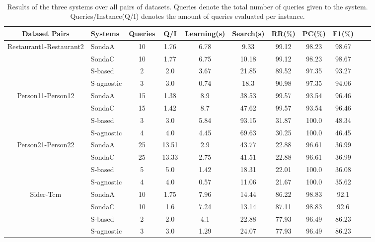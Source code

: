\begin{center}
\begin{table*}[h]
\centering
\scriptsize\tt
\caption{Results of the three systems over all pairs of datasets. Queries denote the total number of queries given to the system. Queries/Instance(Q/I) denotes the amount of queries evaluated per instance.} 
    \begin{tabular}{|c|l|c|c|c|c|c|c|c|c|c|}
        \hline
        Dataset Pairs & Systems & Queries & Q/I & Learning(s) & Search(s)  & RR($\%$) & PC($\%$) &  F1($\%$) \\ \hline

\multirow{4}{*}{Restaurant1-Restaurant2} & SondaA     & 10 & 1.76   & 6.78  & 9.33  & 99.12 & 98.23 & 98.67       \\
											& SondaC    & 10 & 1.77   & 6.75  & 10.18 & 99.12 & 98.23 & 98.67\\
											& S-based   & 2 & 2.0   & 3.67  & 21.85 &   89.52 & 97.35 & 93.27\\
 											& S-agnostic & 3 & 3.0   & 0.74  & 18.3    & 90.98 & 97.35 & 94.06   \\ \hline
 											
\multirow{4}{*}{Person11-Person12} & SondaA    & 15 & 1.38   & 8.9  & 38.53   & 99.57 & 93.54 & 96.46 \\
											& SondaC   & 15 & 1.42   & 8.7  & 47.62  & 99.57 & 93.54 & 96.46 \\
											& S-based   & 3 & 3.0   & 5.84  & 93.15  & 31.87 & 100.0 & 48.34\\
 											& S-agnostic   & 4 & 4.0   & 4.45  & 69.63      & 30.25 & 100.0 & 46.45 \\ \hline

\multirow{4}{*}{Person21-Person22} & SondaA  & 25 & 13.51   & 2.9  & 43.77   & 22.88 & 96.61 & 36.99 \\
											& SondaC    & 25 & 13.33   & 2.75  & 41.51 & 22.88 & 96.61 & 36.99\\
											& S-based   & 5 & 5.0   & 1.42  & 18.31  & 22.01 & 100.0 & 36.08\\
 											& S-agnostic     & 4 & 4.0   & 0.57  & 11.06  & 21.67 & 100.0 & 35.62  	\\ \hline 										

 \multirow{4}{*}{Sider-Tcm} & SondaA         & 10 & 1.75   & 7.96  & 14.44   & 86.22 & 98.83 & 92.1     \\
 											& SondaC    & 10 & 1.6   & 7.24  & 13.14   & 87.11 & 98.83 & 92.6 \\
											& S-based   & 2 & 2.0   & 4.1  & 22.88   & 77.93 & 96.49 & 86.23 \\
 											& S-agnostic      & 3 & 3.0   & 1.29  & 24.07   & 77.93 & 96.49 & 86.23    \\ \hline
 											

\end{tabular}
\end{table*}
\end{center}
